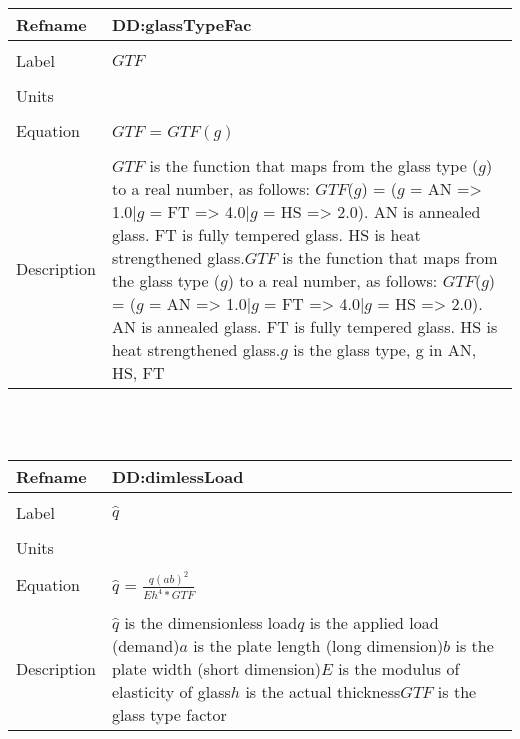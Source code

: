 \documentclass[12pt]{article}
\begin{document}
~\newline
\noindent \begin{minipage}{\textwidth}
\begin{tabular}{p{} p{}}
\toprule \textbf{Refname} & \textbf{DD:glassTypeFac}
\label{DD:glassTypeFac}
\\ \midrule \\
Label & $GTF$
\\ \midrule \\
Units & 
\\ \midrule \\
Equation & $GTF$ = $GTF(g)$
\\ \midrule \\
Description & $GTF$ is the function that maps from the glass type ($g$) to a real number, as follows: $GTF$($g$) = ($g$ = AN => 1.0|$g$ = FT => 4.0|$g$ = HS => 2.0). AN is annealed glass. FT is fully tempered glass. HS is heat strengthened glass.\newline$GTF$ is the function that maps from the glass type ($g$) to a real number, as follows: $GTF$($g$) = ($g$ = AN => 1.0|$g$ = FT => 4.0|$g$ = HS => 2.0). AN is annealed glass. FT is fully tempered glass. HS is heat strengthened glass.\newline$g$ is the glass type, g in {AN, HS, FT}
\\ \bottomrule \end{tabular}
\end{minipage}\\
~\newline
\noindent \begin{minipage}{\textwidth}
\begin{tabular}{p{} p{}}
\toprule \textbf{Refname} & \textbf{DD:dimlessLoad}
\label{DD:dimlessLoad}
\\ \midrule \\
Label & $\hat{q}$
\\ \midrule \\
Units & 
\\ \midrule \\
Equation & $\hat{q}$ = $\frac{q(ab)^{2}}{Eh^{4}*GTF}$
\\ \midrule \\
Description & $\hat{q}$ is the dimensionless load\newline$q$ is the applied load (demand)\newline$a$ is the plate length (long dimension)\newline$b$ is the plate width (short dimension)\newline$E$ is the modulus of elasticity of glass\newline$h$ is the actual thickness\newline$GTF$ is the glass type factor
\\ \bottomrule \end{tabular}
\end{minipage}\\
\end{document}
